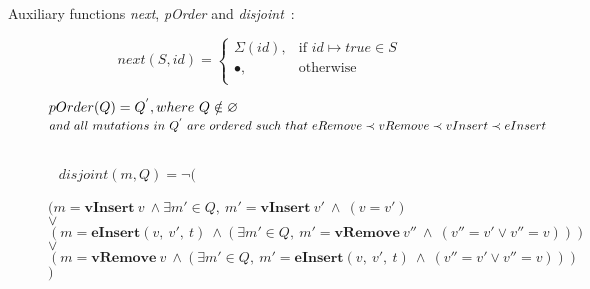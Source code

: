\begin{frame}
Auxiliary functions \emph{next}, \emph{pOrder} and \emph{disjoint}~:
\begin{tiny}
\begin{figure}
\begin{center}
\[
    next(S, id)= 
\begin{cases}
    \Sigma(id), & \text{if } id \mapsto true \in S\\
    \bullet,              & \text{otherwise}\\
\end{cases}
\]

$\begin{array}{@{}l@{~}l@{\quad}l@{\!\!\!\!\!\!}r}
 pOrder(Q) = Q^{'}, where~Q \notin \varnothing
\end{array}
$
$\begin{array}{@{}l@{~}l@{\quad}l@{\!\!\!\!\!\!}r}
and~all~mutations~in~Q^{'}~are~ordered~such~that~eRemove \prec vRemove \prec vInsert \prec eInsert\\ 
\end{array}
$

$\begin{array}{@{}l@{~}l@{\quad}l@{\!\!\!\!\!\!}r}
\\
\\
\\
\end{array}
$
$disjoint(m, Q) = \neg($\\
$(m = \textbf{vInsert}~v~\wedge \exists m' \in Q,~m' = \textbf{vInsert}~v'~\wedge~(v=v')$\\
$\vee $\\
$(m = \textbf{eInsert} (v,~v',~t)~\wedge (\exists m' \in Q,~m' = \textbf{vRemove}~v''~\wedge~(v''=v'\vee v'' = v)))$\\
$\vee $\\
$(m = \textbf{vRemove}~v~\wedge (\exists m' \in Q,~m' = \textbf{eInsert} (v,~v',~t)~\wedge~(v''=v'\vee v'' = v)))$\\
$)$


\end{center}
\label{fig-auxFunc}
\end{figure}
\end{tiny}
\end{frame}


